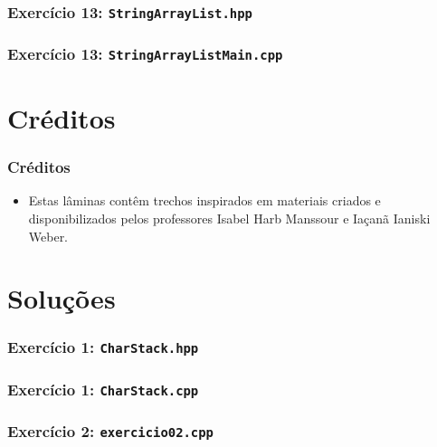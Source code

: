 \documentclass[aspectratio=169]{beamer}
\begin{document}
\begin{frame}[fragile]\frametitle{Exercício 13: \texttt{StringArrayList.hpp}}
\fontsize{6pt}{6pt}\selectfont{

}
\end{frame}

\begin{frame}[fragile]\frametitle{Exercício 13: \texttt{StringArrayListMain.cpp}}
\fontsize{3pt}{5pt}\selectfont{

}
\end{frame}

\section{Créditos}

\begin{frame}\frametitle{Créditos}
\begin{itemize}
	\item Estas lâminas contêm trechos inspirados em materiais criados e disponibilizados pelos professores Isabel Harb Manssour e Iaçanã Ianiski Weber.
\end{itemize}
\end{frame}

\section{Soluções}

\begin{frame}[fragile]\frametitle{Exercício 1: \texttt{CharStack.hpp}}

\end{frame}

\begin{frame}[fragile]\frametitle{Exercício 1: \texttt{CharStack.cpp}}
\fontsize{5pt}{5pt}\selectfont{

}
\end{frame}

\begin{frame}[fragile]\frametitle{Exercício 2: \texttt{exercicio02.cpp}}

\end{frame}
\end{document}
